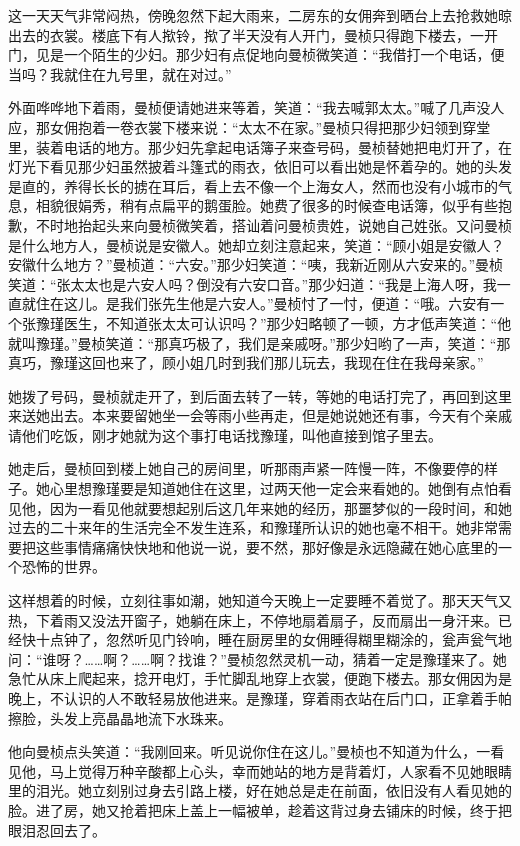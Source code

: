 \par 这一天天气非常闷热，傍晚忽然下起大雨来，二房东的女佣奔到晒台上去抢救她晾出去的衣裳。楼底下有人揿铃，揿了半天没有人开门，曼桢只得跑下楼去，一开门，见是一个陌生的少妇。那少妇有点促地向曼桢微笑道：“我借打一个电话，便当吗？我就住在九号里，就在对过。”
\par 外面哗哗地下着雨，曼桢便请她进来等着，笑道：“我去喊郭太太。”喊了几声没人应，那女佣抱着一卷衣裳下楼来说：“太太不在家。”曼桢只得把那少妇领到穿堂里，装着电话的地方。那少妇先拿起电话簿子来查号码，曼桢替她把电灯开了，在灯光下看见那少妇虽然披着斗篷式的雨衣，依旧可以看出她是怀着孕的。她的头发是直的，养得长长的掳在耳后，看上去不像一个上海女人，然而也没有小城市的气息，相貌很娟秀，稍有点扁平的鹅蛋脸。她费了很多的时候查电话簿，似乎有些抱歉，不时地抬起头来向曼桢微笑着，搭讪着问曼桢贵姓，说她自己姓张。又问曼桢是什么地方人，曼桢说是安徽人。她却立刻注意起来，笑道：“顾小姐是安徽人？安徽什么地方？”曼桢道：“六安。”那少妇笑道：“咦，我新近刚从六安来的。”曼桢笑道：“张太太也是六安人吗？倒没有六安口音。”那少妇道：“我是上海人呀，我一直就住在这儿。是我们张先生他是六安人。”曼桢忖了一忖，便道：“哦。六安有一个张豫瑾医生，不知道张太太可认识吗？”那少妇略顿了一顿，方才低声笑道：“他就叫豫瑾。”曼桢笑道：“那真巧极了，我们是亲戚呀。”那少妇哟了一声，笑道：“那真巧，豫瑾这回也来了，顾小姐几时到我们那儿玩去，我现在住在我母亲家。”
\par 她拨了号码，曼桢就走开了，到后面去转了一转，等她的电话打完了，再回到这里来送她出去。本来要留她坐一会等雨小些再走，但是她说她还有事，今天有个亲戚请他们吃饭，刚才她就为这个事打电话找豫瑾，叫他直接到馆子里去。
\par 她走后，曼桢回到楼上她自己的房间里，听那雨声紧一阵慢一阵，不像要停的样子。她心里想豫瑾要是知道她住在这里，过两天他一定会来看她的。她倒有点怕看见他，因为一看见他就要想起别后这几年来她的经历，那噩梦似的一段时间，和她过去的二十来年的生活完全不发生连系，和豫瑾所认识的她也毫不相干。她非常需要把这些事情痛痛快快地和他说一说，要不然，那好像是永远隐藏在她心底里的一个恐怖的世界。
\par 这样想着的时候，立刻往事如潮，她知道今天晚上一定要睡不着觉了。那天天气又热，下着雨又没法开窗子，她躺在床上，不停地扇着扇子，反而扇出一身汗来。已经快十点钟了，忽然听见门铃响，睡在厨房里的女佣睡得糊里糊涂的，瓮声瓮气地问：“谁呀？……啊？……啊？找谁？”曼桢忽然灵机一动，猜着一定是豫瑾来了。她急忙从床上爬起来，捻开电灯，手忙脚乱地穿上衣裳，便跑下楼去。那女佣因为是晚上，不认识的人不敢轻易放他进来。是豫瑾，穿着雨衣站在后门口，正拿着手帕擦脸，头发上亮晶晶地流下水珠来。
\par 他向曼桢点头笑道：“我刚回来。听见说你住在这儿。”曼桢也不知道为什么，一看见他，马上觉得万种辛酸都上心头，幸而她站的地方是背着灯，人家看不见她眼睛里的泪光。她立刻别过身去引路上楼，好在她总是走在前面，依旧没有人看见她的脸。进了房，她又抢着把床上盖上一幅被单，趁着这背过身去铺床的时候，终于把眼泪忍回去了。
